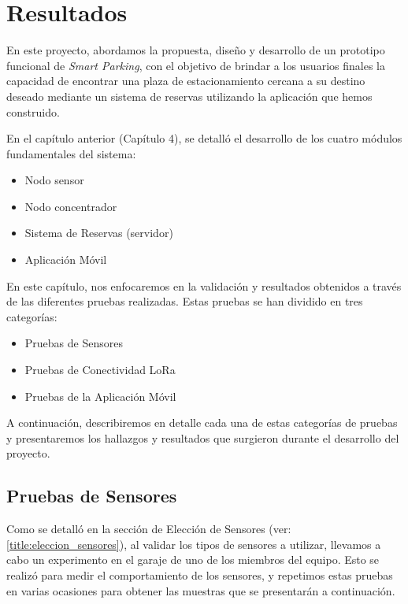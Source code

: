 \clearpage
\section{Resultados}{\label{title:resultados}}
En este proyecto, abordamos la propuesta, diseño y desarrollo de un prototipo funcional de \textit{Smart Parking}, con el objetivo de brindar a los usuarios finales la capacidad de encontrar una plaza de estacionamiento cercana a su destino deseado mediante un sistema de reservas utilizando la aplicación que hemos construido.

En el capítulo anterior (Capítulo 4), se detalló el desarrollo de los cuatro módulos fundamentales del sistema:

\begin{itemize}
    \item Nodo sensor
    \item Nodo concentrador
    \item Sistema de Reservas (servidor)
    \item Aplicación Móvil
\end{itemize}

En este capítulo, nos enfocaremos en la validación y resultados obtenidos a través de las diferentes pruebas realizadas. Estas pruebas se han dividido en tres categorías:
\begin{itemize}
    \item Pruebas de Sensores
    \item Pruebas de Conectividad LoRa
    \item Pruebas de la Aplicación Móvil
\end{itemize}

A continuación, describiremos en detalle cada una de estas categorías de pruebas y presentaremos los hallazgos y resultados que surgieron durante el desarrollo del proyecto.

\subsection{Pruebas de Sensores}\label{title:pruebas_sensores}

Como se detalló en la sección de Elección de Sensores (ver: \ref{title:eleccion_sensores}), al validar los tipos de sensores a utilizar, llevamos a cabo un experimento en el garaje de uno de los miembros del equipo. Esto se realizó para medir el comportamiento de los sensores, y repetimos estas pruebas en varias ocasiones para obtener las muestras que se presentarán a continuación.

